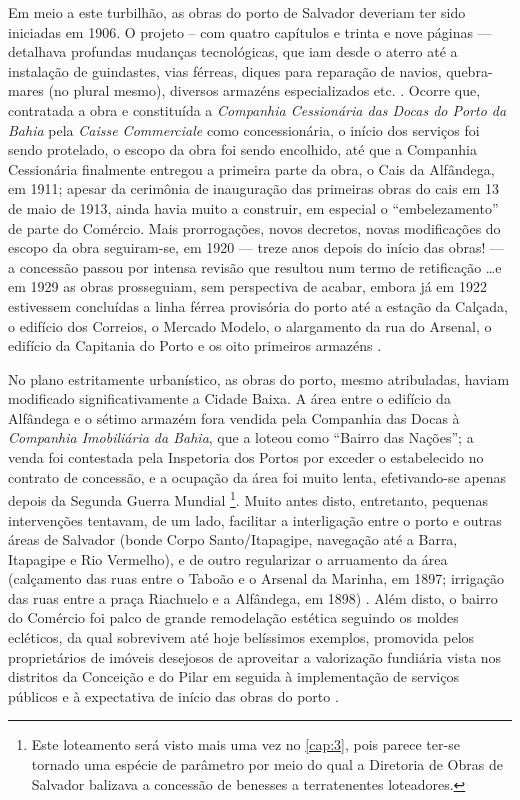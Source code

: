 Em meio a este turbilhão, as obras do porto de Salvador deveriam ter sido iniciadas em 1906. O projeto -- com quatro capítulos e trinta e nove páginas --- detalhava profundas mudanças tecnológicas, que iam desde o aterro até a instalação de guindastes, vias férreas, diques para reparação de navios, quebra-mares (no plural mesmo), diversos armazéns especializados etc. \cite[p.~186]{rosado_porto_2016}. Ocorre que, contratada a obra e constituída a \textit{Companhia Cessionária das Docas do Porto da Bahia} pela \textit{Caisse Commerciale} como concessionária, o início dos serviços foi sendo protelado, o escopo da obra foi sendo encolhido, até que a Companhia Cessionária finalmente entregou a primeira parte da obra, o Cais da Alfândega, em 1911; apesar da cerimônia de inauguração das primeiras obras do cais em 13 de maio de 1913, ainda havia muito a construir, em especial o ``embelezamento'' de parte do Comércio. Mais prorrogações, novos decretos, novas modificações do escopo da obra seguiram-se, em 1920 --- treze anos depois do início das obras! --- a concessão passou por intensa revisão que resultou num termo de retificação \dots e em 1929 as obras prosseguiam, sem perspectiva de acabar, embora já em 1922 estivessem concluídas a linha férrea provisória do porto até a estação da Calçada, o edifício dos Correios, o Mercado Modelo, o alargamento da rua do Arsenal, o edifício da Capitania do Porto e os oito primeiros armazéns \cite[p.~186-196]{rosado_porto_2016}. 

No plano estritamente urbanístico, as obras do porto, mesmo atribuladas, haviam modificado significativamente a Cidade Baixa. A área entre o edifício da Alfândega e o sétimo armazém fora vendida pela Companhia das Docas à \textit{Companhia Imobiliária da Bahia}, que a loteou como ``Bairro das Nações''; a venda foi contestada pela Inspetoria dos Portos por exceder o estabelecido no contrato de concessão, e a ocupação da área foi muito lenta, efetivando-se apenas depois da Segunda Guerra Mundial \cite[p.~205-206]{almeida_vitrinescomercio_2014}\footnote{Este loteamento será visto mais uma vez no \autoref{cap:3}, pois parece ter-se tornado uma espécie de parâmetro por meio do qual a Diretoria de Obras de Salvador balizava a concessão de benesses a terratenentes loteadores.}. Muito antes disto, entretanto, pequenas intervenções tentavam, de um lado, facilitar a interligação entre o porto e outras áreas de Salvador (bonde Corpo Santo/Itapagipe, navegação até a Barra, Itapagipe e Rio Vermelho), e de outro regularizar o arruamento da área (calçamento das ruas entre o Taboão e o Arsenal da Marinha, em 1897; irrigação das ruas entre a praça Riachuelo e a Alfândega, em 1898) \cite[p.~208-209]{almeida_vitrinescomercio_2014}. Além disto, o bairro do Comércio foi palco de grande remodelação estética seguindo os moldes ecléticos, da qual sobrevivem até hoje belíssimos exemplos, promovida pelos proprietários de imóveis desejosos de aproveitar a valorização fundiária vista nos distritos da Conceição e do Pilar em seguida à implementação de serviços públicos e à expectativa de início das obras do porto \cite[p.~251-304]{almeida_vitrinescomercio_2014}.

